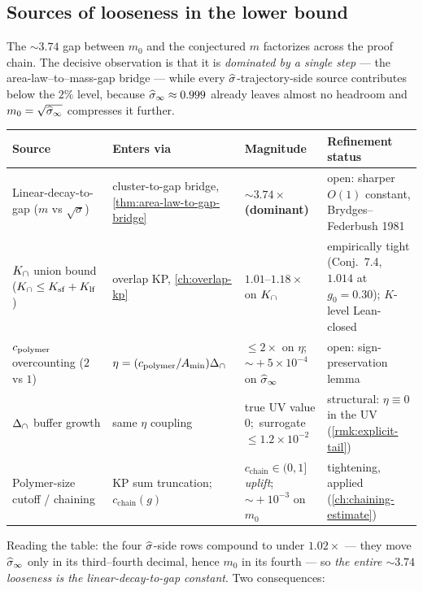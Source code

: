 \subsection{Sources of looseness in the lower bound}
\label{sec:looseness-decomposition}

The $\sim 3.74$ gap between $m_0$ and the conjectured $m$ factorizes
across the proof chain.  The decisive observation is that it is
\emph{dominated by a single step} --- the area-law--to--mass-gap
bridge --- while every $\widehat{\sigma}$-trajectory-side source contributes
below the $2\%$ level, because $\widehat{\sigma}_\infty \approx 0.999$ already leaves
almost no headroom and $m_0 = \sqrt{\widehat{\sigma}_\infty}$ compresses it further.

\begin{center}
\renewcommand{\arraystretch}{1.3}
\begin{tabular}{p{3.5cm}p{2.6cm}p{2.3cm}p{3.0cm}}
\toprule
\textbf{Source} & \textbf{Enters via} & \textbf{Magnitude} &
  \textbf{Refinement status} \\
\midrule
Linear-decay-to-gap ($m$ vs $\sqrt{\sigma}$) &
  cluster-to-gap bridge, \cref{thm:area-law-to-gap-bridge} &
  $\sim 3.74\times$ \textbf{(dominant)} &
  open: sharper $O(1)$ constant, Brydges--Federbush 1981 \\
$K_{\cap}$ union bound ($K_{\cap} \le K_{\mathrm{sf}} + K_{\mathrm{lf}}$) &
  overlap KP, \cref{ch:overlap-kp} &
  $1.01$--$1.18\times$ on $K_{\cap}$ &
  empirically tight (Conj.\ 7.4, $1.014$ at $g_0=0.30$); $K$-level
  Lean-closed \\
$c_{\mathrm{polymer}}$ overcounting ($2$ vs $1$) &
  $\eta = (c_{\mathrm{polymer}}/A_{\min})\Delta_{\cap}$ &
  $\le 2\times$ on $\eta$;\, $\sim\!+5\times10^{-4}$ on $\widehat{\sigma}_\infty$ &
  open: sign-preservation lemma \\
$\Delta_{\cap}$ buffer growth &
  same $\eta$ coupling &
  true UV value $0$;\, surrogate $\le 1.2\times10^{-2}$ &
  structural: $\eta \equiv 0$ in the UV (\cref{rmk:explicit-tail}) \\
Polymer-size cutoff / chaining &
  KP sum truncation; $c_{\mathrm{chain}}(g)$ &
  $c_{\mathrm{chain}}\!\in\!(0,1]$ \emph{uplift};\, $\sim\!+10^{-3}$ on $m_0$ &
  tightening, applied (\cref{ch:chaining-estimate}) \\
\bottomrule
\end{tabular}
\end{center}

Reading the table: the four $\widehat{\sigma}$-side rows compound to under
$1.02\times$ --- they move $\widehat{\sigma}_\infty$ only in its third--fourth
decimal, hence $m_0$ in its fourth --- so \emph{the entire $\sim 3.74$
looseness is the linear-decay-to-gap constant}.  Two consequences:


